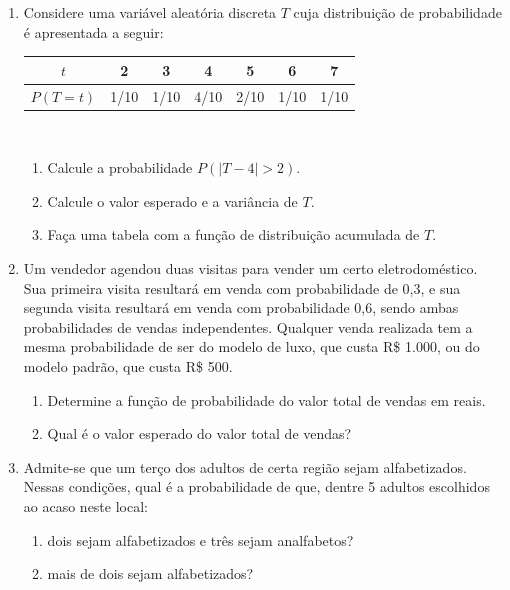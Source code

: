 \documentclass{article}
\begin{document}
\begin{enumerate}

    
    \item Considere uma variável aleatória discreta $T$ cuja distribuição de probabilidade é apresentada a seguir:
    \begin{center}
    \begin{tabular}{c|cccccc}
    \hline
    $t$ & 2 & 3 & 4 & 5 & 6 & 7 \\
    \hline
    $P(T=t)$ & 1/10 & 1/10 & 4/10 & 2/10 & 1/10 & 1/10 \\
    \hline
    \end{tabular}\\
    \end{center}
    \begin{enumerate}
    	\item Calcule a probabilidade $P(|T-4|>2)$. 
    	\item Calcule o valor esperado e a variância de $T$.
    	\item Faça uma tabela com a função de distribuição acumulada de $T$.
    \end{enumerate}
    
    \item Um vendedor agendou duas visitas para vender um certo eletrodoméstico. Sua primeira visita resultará em venda com probabilidade de 0,3, e sua segunda visita resultará em venda com probabilidade 0,6, sendo ambas probabilidades de vendas independentes. Qualquer venda realizada tem a mesma probabilidade de ser do modelo de luxo, que custa R\$ 1.000, ou do modelo padrão, que custa R\$ 500.
        \begin{enumerate}
    	\item Determine a função de probabilidade do valor total de vendas em reais.
    	\item Qual é o valor esperado do valor total de vendas?
    \end{enumerate}
    
    
    \item Admite-se que um terço dos adultos de certa região sejam alfabetizados. Nessas condições, qual é a probabilidade de que, dentre 5 adultos escolhidos ao acaso neste local:
    \begin{enumerate}
    	\item dois sejam alfabetizados e três sejam analfabetos?
    	
    	\item mais de dois sejam alfabetizados?
    \end{enumerate}
    

\end{enumerate}
\end{document}
